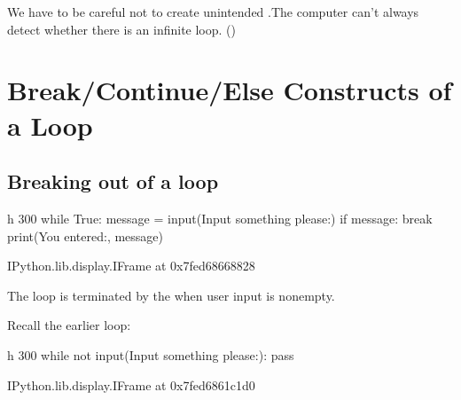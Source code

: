 \documentclass[letterpaper,10pt,english]{sphinxmanual}
\begin{document}
We have to be careful not to create unintended .The computer can’t always detect whether there is an infinite loop. ()


\section{Break/Continue/Else Constructs of a Loop}
\label{\detokenize{Lecture3/Iteration:break-continue-else-constructs-of-a-loop}}

\subsection{Breaking out of a loop}
\label{\detokenize{Lecture3/Iteration:breaking-out-of-a-loop}}

\begin{sphinxVerbatim}[commandchars=\\\{\}]
 \PYGZhy{}h 300
while True:
    message = input(\PYGZsq{}Input something please:\PYGZsq{})
    if message: break
print(\PYGZsq{}You entered:\PYGZsq{}, message)
\end{sphinxVerbatim}

\begin{sphinxVerbatim}[commandchars=\\\{\}]
\PYGZlt{}IPython.lib.display.IFrame at 0x7fed68668828\PYGZgt{}
\end{sphinxVerbatim}

The loop is terminated by the  when user input is non\sphinxhyphen{}empty.


Recall the earlier  loop:

\begin{sphinxVerbatim}[commandchars=\\\{\}]
 \PYGZhy{}h 300
while not input(\PYGZsq{}Input something please:\PYGZsq{}): pass 
\end{sphinxVerbatim}

\begin{sphinxVerbatim}[commandchars=\\\{\}]
\PYGZlt{}IPython.lib.display.IFrame at 0x7fed6861c1d0\PYGZgt{}
\end{sphinxVerbatim}
\end{document}
